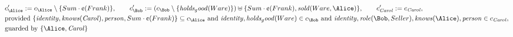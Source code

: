 \begin{align*}
&
c'_
{
\Alice
}
 := 
c_
{
\Alice
}
 \setminus 
\{
Sum
\cdot
\text{\textcent}
(
Frank
)
\}
, \qquad 
c'_
{
\Bob
}
 := 
(c_
{
\Bob
}
 \setminus 
\{
\mathit{
holds_good
}
(
Ware
)
\}
) \uplus 
\{
Sum
\cdot
\text{\textcent}
(
Frank
)
,
\mathit{
sold
}
(
Ware
,
\Alice
)
\}
, \qquad 
c'_
{
\mathit{Carol}
}
 := 
c_
{
\mathit{Carol}
}
,\\
&
\text{provided } 
\{
\mathit{
identity
}
,
\mathit{
knows
}
(
\mathit{Carol}
)
,
\mathit{
person
}
,
Sum
\cdot
\text{\textcent}
(
Frank
)
\}
 \subseteq c_
{
\Alice
}
 \text{ and } 
\mathit{
identity
}
,
\mathit{
holds_good
}
(
Ware
)
 \in c_
{
\Bob
}
 \text{ and } 
\mathit{
identity
}
,
\mathit{
role
}
(
\Bob
,
Seller
)
,
\mathit{
knows
}
(
\Alice
)
,
\mathit{
person
}
 \in c_
{
\mathit{Carol}
}
,\\
&
\text{guarded by } \{
\Alice
,
\mathit{Carol}
\}
\end{align*}
